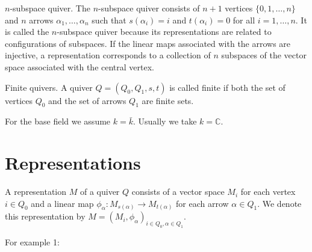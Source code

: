 \documentclass[11pt, a4paper]{report}
\newcommand{\C}{\mathbb{C}}
\begin{document}
\begin{example} 
$ n $-subspace quiver. 
The $n$-subspace quiver consists of $n+1$ vertices $\{0, 1, \dots, n\}$ and $n$ arrows $\alpha_1, \dots, \alpha_n$ such that $s(\alpha_i) = i$ and $t(\alpha_i) = 0$ for all $i=1, \dots, n$.
It is called the $n$-subspace quiver because its representations are related to configurations of subspaces. If the linear maps associated with the arrows are injective, a representation corresponds to a collection of $n$ subspaces of the vector space associated with the central vertex.
\begin{center}
\end{center}
\end{example}

\begin{example} 
Finite quivers.
A quiver $Q=(Q_0, Q_1, s, t)$ is called finite if both the set of vertices $Q_0$ and the set of arrows $Q_1$ are finite sets.
\end{example}

For the base field we assume $ k=\bar{k} $. Usually we take $ k=\C $. 

\section{Representations}

\begin{definition} 
A representation $M$ of a quiver $Q$ consists of a vector space $M_i$ for each vertex $i \in Q_0$ and a linear map $\phi_{\alpha}: M_{s(\alpha)} \to M_{t(\alpha)}$ for each arrow $\alpha \in Q_1$. We denote this representation by $M=(M_i, \phi_{\alpha})_{i \in Q_0, \alpha \in Q_1}$.
\end{definition}

\begin{example} 
For example 1: 
\begin{center}
\end{center}
\end{example}
\end{document}
